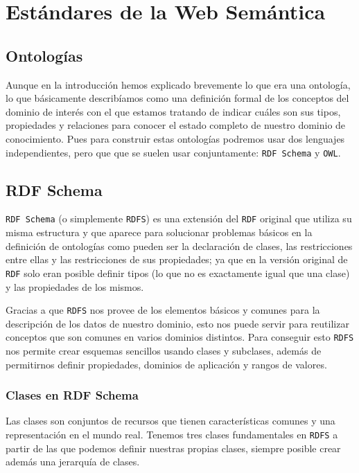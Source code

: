 \chapter{Estándares de la Web Semántica}

\section{Ontologías}
Aunque en la introducción hemos explicado brevemente lo que era una ontología, lo que básicamente describíamos como una definición formal de los conceptos del dominio de interés con el que estamos tratando de indicar cuáles son sus tipos, propiedades y relaciones para conocer el estado completo de nuestro dominio de conocimiento. Pues para construir estas ontologías podremos usar dos lenguajes independientes, pero que que se suelen usar conjuntamente: {\tt RDF Schema} y {\tt OWL}.

\section{RDF Schema}
{\tt RDF Schema} (o simplemente {\tt RDFS}) es una extensión del {\tt RDF} original que utiliza su misma estructura y que aparece para solucionar problemas básicos en la definición de ontologías como pueden ser la declaración de clases, las restricciones entre ellas y las restricciones de sus propiedades; ya que en la versión original de {\tt RDF} solo eran posible definir tipos (lo que no es exactamente igual que una clase) y las propiedades de los mismos.

\bigskip
Gracias a que {\tt RDFS} nos provee de los elementos básicos y comunes para la descripción de los datos de nuestro dominio, esto nos puede servir para reutilizar conceptos que son comunes en varios dominios distintos. Para conseguir esto {\tt RDFS} nos permite crear esquemas sencillos usando clases y subclases, además de permitirnos definir propiedades, dominios de aplicación y rangos de valores.

\newpage
\subsection{Clases en RDF Schema}
Las clases son conjuntos de recursos que tienen características comunes y una representación en el mundo real. Tenemos tres clases fundamentales en {\tt RDFS} a partir de las que podemos definir nuestras propias clases, siempre posible crear además una jerarquía de clases.

